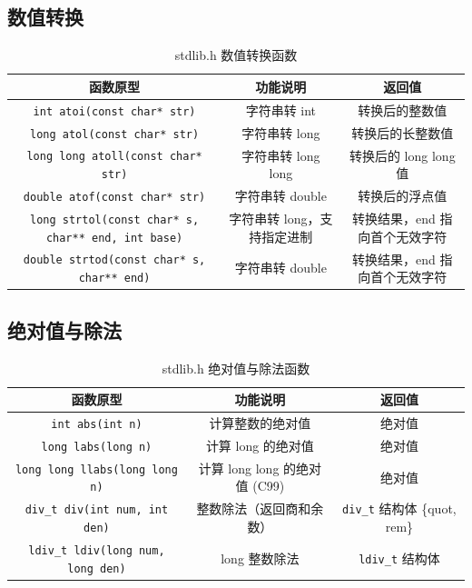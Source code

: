 \subsection{数值转换}

\begin{table}[H]
\centering
\small
\renewcommand{\arraystretch}{1.6}
\begin{tabulary}{\linewidth}{CCC}
\toprule
\textbf{函数原型} & \textbf{功能说明} & \textbf{返回值} \\ \midrule
\texttt{int atoi(const char* str)} & 字符串转 int & 转换后的整数值 \\ 
\texttt{long atol(const char* str)} & 字符串转 long & 转换后的长整数值 \\ 
\texttt{long long atoll(const char* str)} & 字符串转 long long & 转换后的 long long 值 \\ 
\texttt{double atof(const char* str)} & 字符串转 double & 转换后的浮点值 \\ 
\texttt{long strtol(const char* s, char** end, int base)} & 字符串转 long，支持指定进制 & 转换结果，end 指向首个无效字符 \\ 
\texttt{double strtod(const char* s, char** end)} & 字符串转 double & 转换结果，end 指向首个无效字符 \\ \bottomrule
\end{tabulary}
\caption{stdlib.h 数值转换函数}
\label{tab:stdlib_conv}
\end{table}

\subsection{绝对值与除法}

\begin{table}[H]
\centering
\small
\renewcommand{\arraystretch}{1.5}
\begin{tabulary}{\linewidth}{CCC}
\toprule
\textbf{函数原型} & \textbf{功能说明} & \textbf{返回值} \\ \midrule
\texttt{int abs(int n)} & 计算整数的绝对值 & 绝对值 \\ 
\texttt{long labs(long n)} & 计算 long 的绝对值 & 绝对值 \\ 
\texttt{long long llabs(long long n)} & 计算 long long 的绝对值 (C99) & 绝对值 \\ 
\texttt{div\_t div(int num, int den)} & 整数除法（返回商和余数） & \texttt{div\_t} 结构体 \{quot, rem\} \\ 
\texttt{ldiv\_t ldiv(long num, long den)} & long 整数除法 & \texttt{ldiv\_t} 结构体 \\ \bottomrule
\end{tabulary}
\caption{stdlib.h 绝对值与除法函数}
\label{tab:stdlib_math}
\end{table}

